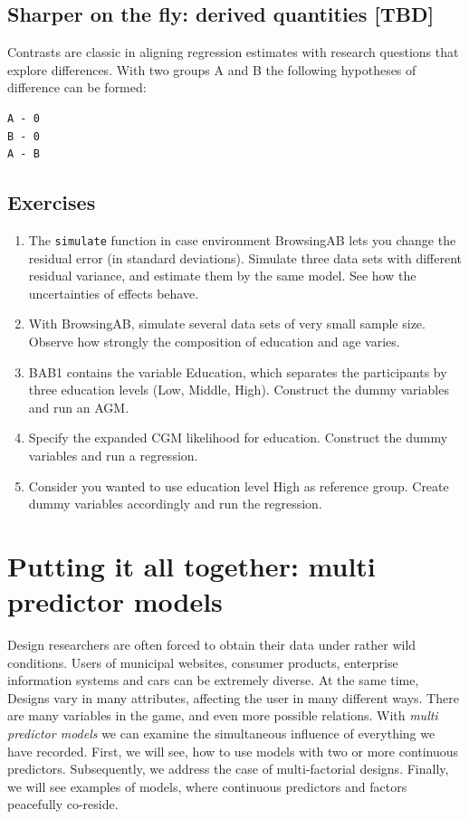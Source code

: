 \documentclass[]{svmono}
\begin{document}
\subsection{Sharper on the fly: derived quantities
{[}TBD{]}}\label{sharper-on-the-fly-derived-quantities-tbd}

Contrasts are classic in aligning regression estimates with research
questions that explore differences. With two groups A and B the
following hypotheses of difference can be formed:

\begin{verbatim}
A - 0
B - 0
A - B
\end{verbatim}

\subsection{Exercises}\label{exercises-3}

\begin{enumerate}
\def\labelenumi{\arabic{enumi}.}
\item
  The \texttt{simulate} function in case environment BrowsingAB lets you
  change the residual error (in standard deviations). Simulate three
  data sets with different residual variance, and estimate them by the
  same model. See how the uncertainties of effects behave.
\item
  With BrowsingAB, simulate several data sets of very small sample size.
  Observe how strongly the composition of education and age varies.
\item
  BAB1 contains the variable Education, which separates the participants
  by three education levels (Low, Middle, High). Construct the dummy
  variables and run an AGM.
\item
  Specify the expanded CGM likelihood for education. Construct the dummy
  variables and run a regression.
\item
  Consider you wanted to use education level High as reference group.
  Create dummy variables accordingly and run the regression.
\end{enumerate}

\section{Putting it all together: multi predictor
models}\label{putting-it-all-together-multi-predictor-models}

Design researchers are often forced to obtain their data under rather
wild conditions. Users of municipal websites, consumer products,
enterprise information systems and cars can be extremely diverse. At the
same time, Designs vary in many attributes, affecting the user in many
different ways. There are many variables in the game, and even more
possible relations. With \emph{multi predictor models} we can examine
the simultaneous influence of everything we have recorded. First, we
will see, how to use models with two or more continuous predictors.
Subsequently, we address the case of multi-factorial designs. Finally,
we will see examples of models, where continuous predictors and factors
peacefully co-reside.
\end{document}
